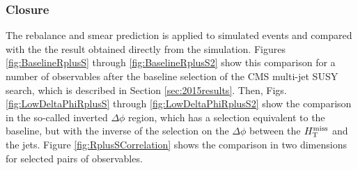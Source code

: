 \subsubsection{Closure}
The rebalance and smear prediction is applied to simulated events and compared with the the result obtained directly from the simulation. Figures \ref{fig:BaselineRplusS} through \ref{fig:BaselineRplusS2} show this comparison for a number of observables after the baseline selection of the CMS multi-jet SUSY search, which is described in Section \ref{sec:2015results}. Then, Figs. \ref{fig:LowDeltaPhiRplusS} through \ref{fig:LowDeltaPhiRplusS2} show the comparison in the so-called inverted $\Delta \phi$ region, which has a selection equivalent to the baseline, but with the inverse of the selection on the $\Delta \phi$ between the $H_{\text{T}}^{\rm miss}$ and the jets. Figure \ref{fig:RplusSCorrelation} shows the comparison in two dimensions for selected pairs of observables. 

